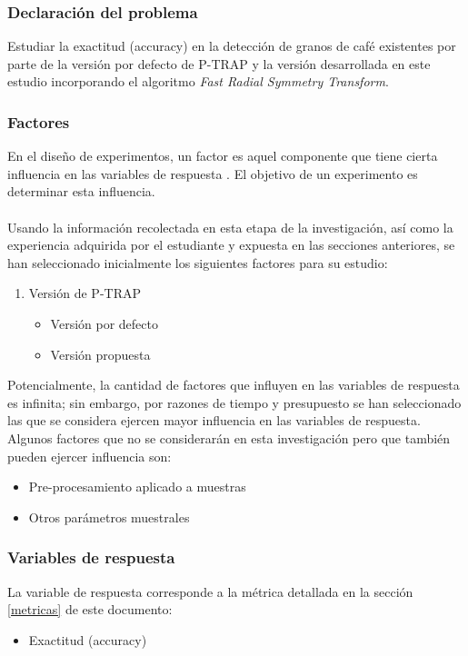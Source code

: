 \subsubsection{Declaraci\'on del problema}
Estudiar la exactitud (accuracy) en la detecci\'on de granos de caf\'e existentes por parte de la versi\'on por defecto de P-TRAP\cite{ptrap} y la versi\'on desarrollada en este estudio incorporando el algoritmo \textit{Fast Radial Symmetry Transform}\cite{loyzelinsky}.
\subsubsection{Factores}
En el dise\~no de experimentos, un factor es aquel componente que tiene cierta
influencia en las variables de respuesta \cite{montgomeryx}. El objetivo de un experimento es determinar esta influencia.
\\\\
Usando la informaci\'on recolectada en esta etapa de la investigaci\'on, as\'i como la experiencia adquirida por el estudiante y expuesta en las secciones anteriores, se han seleccionado inicialmente los siguientes factores para su estudio:
\begin{enumerate}
	\item Versi\'on de P-TRAP
		\begin{itemize}
			\item Versi\'on por defecto 
			\item Versi\'on propuesta
		\end{itemize}
\end{enumerate}
Potencialmente, la cantidad de factores que influyen en las variables de respuesta es infinita; sin embargo, por razones de tiempo y presupuesto se han seleccionado las que se considera ejercen mayor influencia en las variables de respuesta. Algunos factores que no se considerar\'an en esta investigaci\'on
pero que tambi\'en pueden ejercer influencia son:
\begin{itemize}
\item Pre-procesamiento aplicado a muestras
\item Otros par\'ametros muestrales
\end{itemize}
\subsubsection{Variables de respuesta}
La variable de respuesta corresponde a la m\'etrica detallada en la secci\'on \ref{metricas} de este documento:
\begin{itemize}
\item Exactitud (accuracy)
\end{itemize}
